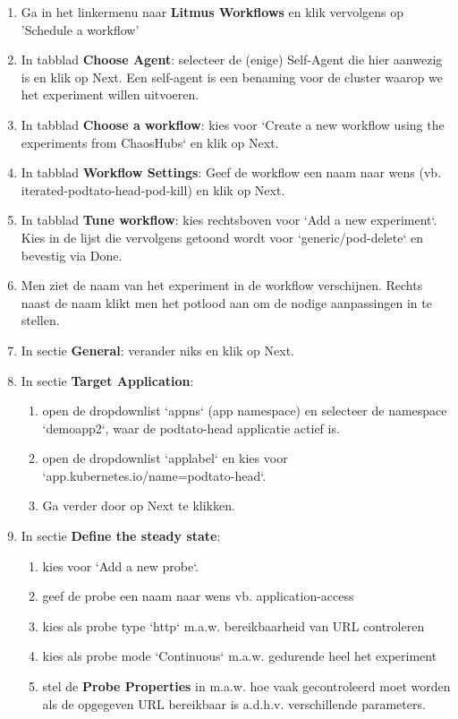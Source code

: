 \begin{enumerate}
    \item Ga in het linkermenu naar {\bf Litmus Workflows} en klik vervolgens op 'Schedule a workflow'
    \item In tabblad {\bf Choose Agent}: selecteer de (enige) Self-Agent die hier aanwezig is en klik op Next. Een self-agent is een benaming voor de cluster waarop we het experiment willen uitvoeren.
    \item In tabblad {\bf Choose a workflow}: kies voor `Create a new workflow using the experiments from ChaosHubs` en klik op Next.
    \item In tabblad {\bf Workflow Settings}: Geef de workflow een naam naar wens (vb. iterated-podtato-head-pod-kill) en klik op Next.
    \item In tabblad {\bf Tune workflow}: kies rechtsboven voor `Add a new experiment`. Kies in de lijst die vervolgens getoond wordt voor `generic/pod-delete` en bevestig via Done.
    \item Men ziet de naam van het experiment in de workflow verschijnen. Rechts naast de naam klikt men het potlood aan om de nodige aanpassingen in te stellen.
    \item In sectie {\bf General}: verander niks en klik op Next.
    \item In sectie {\bf Target Application}:
        \begin{enumerate}
            \item open de dropdownlist `appns` (app namespace) en selecteer de namespace `demoapp2`, waar de podtato-head applicatie actief is.
            \item open de dropdownlist `applabel` en kies voor `app.kubernetes.io/name=podtato-head`.
            \item Ga verder door op Next te klikken.
        \end{enumerate}
    \item In sectie {\bf Define the steady state}:
        \begin{enumerate}
            \item kies voor `Add a new probe`.
            \item geef de probe een naam naar wens vb. application-access
            \item kies als probe type `http` m.a.w. bereikbaarheid van URL controleren
            \item kies als probe mode `Continuous` m.a.w. gedurende heel het experiment
            \item stel de {\bf Probe Properties} in m.a.w. hoe vaak gecontroleerd moet worden als de opgegeven URL bereikbaar is a.d.h.v. verschillende parameters.
            

\end{enumerate}
\end{enumerate}
